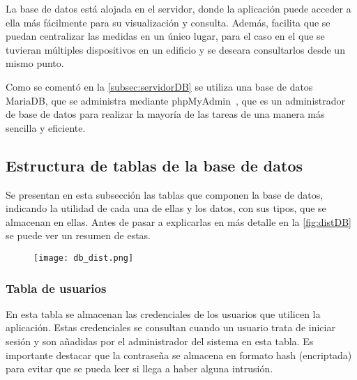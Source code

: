 La base de datos está alojada en el servidor, donde la aplicación puede acceder a ella más fácilmente para su visualización y consulta. Además, facilita que se puedan centralizar las medidas en un único lugar, para el caso en el que se tuvieran múltiples dispositivos en un edificio y se deseara consultarlos desde un mismo punto.

Como se comentó en la \autoref{subsec:servidorDB} se utiliza una base de datos MariaDB, que se administra mediante phpMyAdmin~\cite{phpmyadmin_phpmyadmin_nodate}, que es un administrador de base de datos para realizar la mayoría de las tareas de una manera más sencilla y eficiente.

\subsection{Estructura de tablas de la base de datos}\label{subsec:estructura-de-tablas-de-la-base-de-datos}
Se presentan en esta subsección las tablas que componen la base de datos, indicando la utilidad de cada una de ellas y los datos, con sus tipos, que se almacenan en ellas. Antes de pasar a explicarlas en más detalle en la \autoref{fig:distDB} se puede ver un resumen de estas.
\begin{figure}[H]
	{\texttt{[image: db\_dist.png]}}
\end{figure}
\subsubsection{Tabla de usuarios}
En esta tabla se almacenan las credenciales de los usuarios que utilicen la aplicación. Estas credenciales se consultan cuando un usuario trata de iniciar sesión y son añadidas por el administrador del sistema en esta tabla. Es importante destacar que la contraseña se almacena en formato hash (encriptada) para evitar que se pueda leer si llega a haber alguna intrusión. 
\pagebreak

